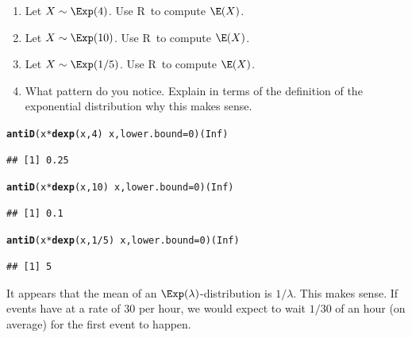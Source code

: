 \documentclass[twoside]{book}\usepackage[]{graphicx}\usepackage[]{xcolor}
\makeatletter
\newcommand{\hlnum}[1]{\textcolor[rgb]{0.686,0.059,0.569}{#1}}%
\newcommand{\hlopt}[1]{\textcolor[rgb]{0,0,0}{#1}}%
\newcommand{\hlstd}[1]{\textcolor[rgb]{0.345,0.345,0.345}{#1}}%
\newcommand{\hlkwc}[1]{\textcolor[rgb]{0.333,0.667,0.333}{#1}}%
\newcommand{\hlkwd}[1]{\textcolor[rgb]{0.737,0.353,0.396}{\textbf{#1}}}%
\newenvironment{kframe}{%
 \def\at@end@of@kframe{}%
 \ifinner\ifhmode%
  \def\at@end@of@kframe{\end{minipage}}%
  \begin{minipage}{\columnwidth}%
 \fi\fi%
 \def\FrameCommand##1{\hskip\@totalleftmargin \hskip-\fboxsep
 \colorbox{shadecolor}{##1}\hskip-\fboxsep
     \hskip-\linewidth \hskip-\@totalleftmargin \hskip\columnwidth}%
 \MakeFramed {\advance\hsize-\width
   \@totalleftmargin\z@ \linewidth\hsize
   \@setminipage}}%
 {\par\unskip\endMakeFramed%
 \at@end@of@kframe}
\newenvironment{knitrout}{}{} %
\def\R{{\sf R}}
\makeatother
\begin{document}
\begin{problem}
	\begin{enumerate}
		\item Let $X \sim \Exp(4)$.  Use \R\ to compute $\E(X)$.
		\item Let $X \sim \Exp(10)$.  Use \R\ to compute $\E(X)$.
		\item Let $X \sim \Exp(1/5)$.  Use \R\ to compute $\E(X)$.
		\item What pattern do you notice.  Explain in terms of 
			the definition of the exponential distribution why this
			makes sense.
	\end{enumerate}
\end{problem}

\begin{solution}
\begin{knitrout}
\color{fgcolor}\begin{kframe}
\begin{alltt}
\hlkwd{antiD}\hlstd{(x} \hlopt{*} \hlkwd{dexp}\hlstd{(x,} \hlnum{4}\hlstd{)} \hlopt{~} \hlstd{x,} \hlkwc{lower.bound} \hlstd{=} \hlnum{0}\hlstd{)(}\hlnum{Inf}\hlstd{)}
\end{alltt}
\begin{verbatim}
## [1] 0.25
\end{verbatim}
\begin{alltt}
\hlkwd{antiD}\hlstd{(x} \hlopt{*} \hlkwd{dexp}\hlstd{(x,} \hlnum{10}\hlstd{)} \hlopt{~} \hlstd{x,} \hlkwc{lower.bound} \hlstd{=} \hlnum{0}\hlstd{)(}\hlnum{Inf}\hlstd{)}
\end{alltt}
\begin{verbatim}
## [1] 0.1
\end{verbatim}
\begin{alltt}
\hlkwd{antiD}\hlstd{(x} \hlopt{*} \hlkwd{dexp}\hlstd{(x,} \hlnum{1}\hlopt{/}\hlnum{5}\hlstd{)} \hlopt{~} \hlstd{x,} \hlkwc{lower.bound} \hlstd{=} \hlnum{0}\hlstd{)(}\hlnum{Inf}\hlstd{)}
\end{alltt}
\begin{verbatim}
## [1] 5
\end{verbatim}
\end{kframe}
\end{knitrout}
	It appears that the mean of an $\Exp(\lambda)$-distribution is $1/\lambda$.  This
	makes sense.  If events have at a rate of $30$ per hour, we would expect to wait
	$1/30$ of an hour (on average) for the first event to happen.
\end{solution}
\end{document}
